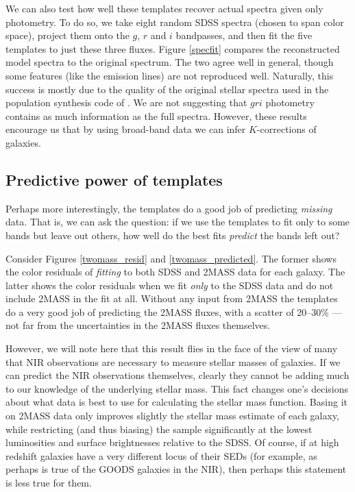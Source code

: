 \documentclass[10pt,preprint]{aastex}
\begin{document}
We can also test how well these templates recover actual spectra given
only photometry. To do so, we take eight random SDSS spectra (chosen
to span color space), project them onto the $g$, $r$ and $i$
bandpasses, and then fit the five templates to just these three
fluxes.  Figure \ref{specfit} compares the reconstructed model spectra
to the original spectrum. The two agree well in general, though some
features (like the emission lines) are not reproduced well.
Naturally, this success is mostly due to the quality of the original
stellar spectra used in the population synthesis code of
\citet{bruzual03a}. We are not suggesting that $gri$ photometry
contains as much information as the full spectra. However, these
results encourage us that by using broad-band data we can infer
$K$-corrections of galaxies.

\subsection{Predictive power of templates}

Perhaps more interestingly, the templates do a good job of predicting
{\it missing} data. That is, we can ask the question: if we use the
templates to fit only to some bands but leave out others, how well do
the best fits {\it predict} the bands left out?
    
Consider Figures \ref{twomass_resid} and \ref{twomass_predicted}. The
former shows the color residuals of {\it fitting} to both SDSS and
2MASS data for each galaxy. The latter shows the color residuals when
we fit {\it only} to the SDSS data and do not include 2MASS in the fit
at all. Without any input from 2MASS the templates do a very good job
of predicting the 2MASS fluxes, with a scatter of 20--30\% --- not far
from the uncertainties in the 2MASS fluxes themselves.

However, we will note here that this result flies in the face of the
view of many that NIR observations are necessary to measure stellar
masses of galaxies. If we can predict the NIR observations themselves,
clearly they cannot be adding much to our knowledge of the underlying
stellar mass. This fact changes one's decisions about what data is
best to use for calculating the stellar mass function.  Basing it on
2MASS data only improves slightly the stellar mass estimate of each
galaxy, while restricting (and thus biasing) the sample significantly
at the lowest luminosities and surface brightnesses relative to the
SDSS. Of course, if at high redshift galaxies have a very different
locus of their SEDs (for example, as perhaps is true of the GOODS
galaxies in the NIR), then perhaps this statement is less true for
them.
\end{document}
